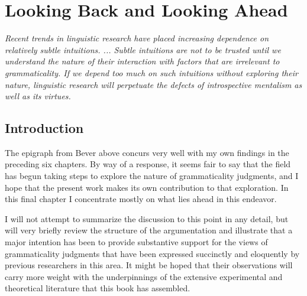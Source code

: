 \chapter{Looking Back and Looking Ahead}\label{sec:7}

 \epigraph{\itshape Recent trends in linguistic research have placed increasing dependence on relatively subtle intuitions. ... Subtle intuitions are not to be trusted until we understand the nature of their interaction with factors that are irrelevant to grammaticality. If we depend too much on such intuitions without exploring their nature, linguistic research will perpetuate the defects of introspective mentalism as well as its virtues.\\[-2\baselineskip]}{\citep{Bever1970b}}

 \section{Introduction}\label{sec:7.1}

 The epigraph from Bever above concurs very well with my own findings in the preceding six chapters. By way of a response, it seems fair to say that the field has begun taking steps to explore the nature of grammaticality judgments, and I hope that the present work makes its own contribution to that exploration. In this final chapter I concentrate mostly on what lies ahead in this endeavor.

 I will not attempt to summarize the discussion to this point in any detail, but will very briefly review the structure of the argumentation and illustrate that a major intention has been to provide substantive support for the views of grammaticality judgments that have been expressed succinctly and eloquently by previous researchers in this area. It might be hoped that their observations will carry more weight with the underpinnings of the extensive experimental and theoretical literature that this book has assembled.

